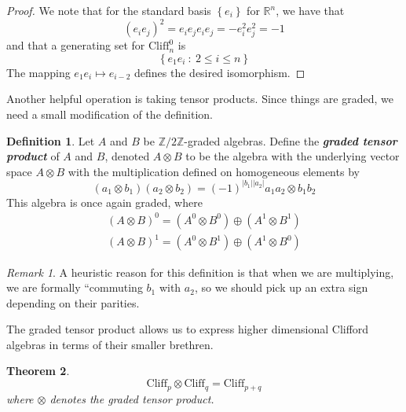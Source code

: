 \documentclass[psamsfonts, 12pt]{amsart}
\newtheorem{thm}{Theorem}[section]
\theoremstyle{definition}
\newtheorem{defn}[thm]{Definition}
\theoremstyle{remark}
\newtheorem*{rem*}{Remark}
\newcommand{\R}{\mathbb{R}}
\newcommand{\ib}[1]{\textbf{\textit{#1}}}
\newcommand{\Z}{\mathbb{Z}}
\newcommand{\Cliff}{\mathrm{Cliff}}
\newcommand{\set}[1]{\left\lbrace #1 \right\rbrace}
\begin{document}
%
\begin{proof}
We note that for the standard basis $\set{e_i}$ for $\R^n$, we have that
\[
(e_ie_j)^2 = e_ie_je_ie_j = -e_i^2e_j^2 = -1
\]
and that a generating set for $\Cliff^0_n$ is
\[
\set{e_1e_i ~:~ 2 \leq i \leq n}
\]
The mapping $e_1e_i \mapsto e_{i-2}$ defines the desired isomorphism.
\end{proof}
%
Another helpful operation is taking tensor products. Since things are graded, we
need a small modification of the definition.
%
\begin{defn}
Let $A$ and $B$ be $\Z/2\Z$-graded algebras. Define the \ib{graded tensor product} of
$A$ and $B$, denoted $A \otimes B$ to be the algebra with the underlying vector space
$A \otimes B$ with the multiplication defined on homogeneous elements by
\[
(a_1\otimes b_1)(a_2\otimes b_2) = (-1)^{|b_1||a_2|}a_1a_2\otimes b_1b_2
\]
This algebra is once again graded, where
\begin{align*}
(A \otimes B)^0 = (A^0 \otimes B^0) \oplus (A^1 \otimes B^1) \\
(A \otimes B)^1 = (A^0 \otimes B^1) \oplus (A^1 \otimes B^0)
\end{align*}
\end{defn}
%
\begin{rem*}
A heuristic reason for this definition is that when we are multiplying, we are formally
``commuting $b_1$ with $a_2$, so we should pick up an extra sign depending on their
parities.
\end{rem*}
%
The graded tensor product allows us to express higher dimensional Clifford algebras
in terms of their smaller brethren.
%
\begin{thm}
\[
\Cliff_p \otimes \Cliff_q = \Cliff_{p+q}
\]
where $\otimes$ denotes the graded tensor product.
\end{thm}
%
\end{document}
